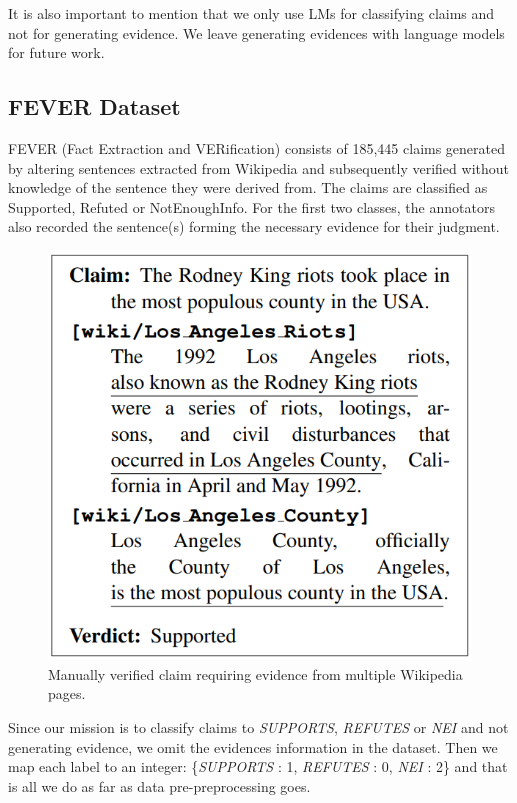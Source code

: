 \documentclass[conference]{IEEEtran}
\begin{document}
It is also important to mention that we only use LMs for classifying claims and not for generating evidence. We leave generating evidences with language models for future work.

\subsection{FEVER Dataset}
FEVER (Fact Extraction and VERification) consists of 185,445 claims generated by altering sentences extracted from Wikipedia and subsequently verified without knowledge of the sentence they were derived from. The claims are classified as Supported, Refuted or NotEnoughInfo. For the first two classes, the annotators also recorded the sentence(s) forming the necessary evidence for their judgment\cite{thorne2018fever}.

\begin{figure}[htp]
    \centering
    \includegraphics[scale=0.3]{fever_example.png}
    \caption{Manually verified claim requiring evidence from multiple Wikipedia pages.}
    \label{fig:fever_example}
\end{figure}

Since our mission is to classify claims to \textit{SUPPORTS}, \textit{REFUTES} or \textit{NEI} and not generating evidence, we omit the evidences information in the dataset. Then we map each label to an integer: \{\textit{SUPPORTS} : 1, \textit{REFUTES} : 0, \textit{NEI} : 2\} and that is all we do as far as data pre-preprocessing goes.
\end{document}

